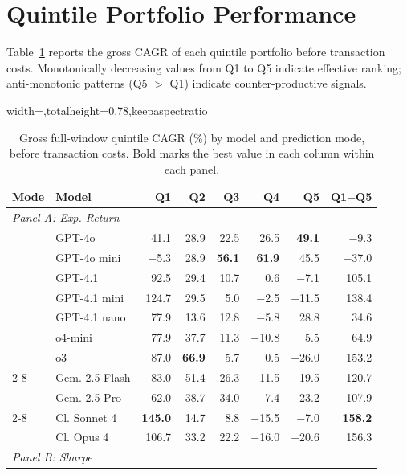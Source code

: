 \section{Quintile Portfolio Performance}
\label{app:quintile-cagr}

Table~\ref{tab:quintile-cagr} reports the gross CAGR of each quintile portfolio before transaction costs.
Monotonically decreasing values from Q1 to Q5 indicate effective ranking; anti-monotonic patterns (Q5 $>$ Q1) indicate counter-productive signals.

\begin{table}[H]
\centering
\caption{Gross full-window quintile CAGR (\%) by model and prediction mode, before transaction costs. Bold marks the best value in each column within each panel.}
\label{tab:quintile-cagr}
\scriptsize
\setlength{\tabcolsep}{3pt}
\renewcommand{\arraystretch}{0.80}
\begin{adjustbox}{width=\textwidth,totalheight=0.78\textheight,keepaspectratio}
\begin{tabular}{ll rrrrrr}
\toprule
\textbf{Mode} & \textbf{Model} & \textbf{Q1} & \textbf{Q2} & \textbf{Q3} & \textbf{Q4} & \textbf{Q5} & \textbf{Q1$-$Q5} \\
\midrule
\multicolumn{8}{l}{\textit{Panel A: Exp. Return}} \\
\midrule
& GPT-4o & 41.1 & 28.9 & 22.5 & 26.5 & \textbf{49.1} & $-$9.3 \\
& GPT-4o mini & $-$5.3 & 28.9 & \textbf{56.1} & \textbf{61.9} & 45.5 & $-$37.0 \\
& GPT-4.1 & 92.5 & 29.4 & 10.7 & 0.6 & $-$7.1 & 105.1 \\
& GPT-4.1 mini & 124.7 & 29.5 & 5.0 & $-$2.5 & $-$11.5 & 138.4 \\
& GPT-4.1 nano & 77.9 & 13.6 & 12.8 & $-$5.8 & 28.8 & 34.6 \\
& o4-mini & 77.9 & 37.7 & 11.3 & $-$10.8 & 5.5 & 64.9 \\
& o3 & 87.0 & \textbf{66.9} & 5.7 & 0.5 & $-$26.0 & 153.2 \\
\cmidrule(l){2-8}
& Gem. 2.5 Flash & 83.0 & 51.4 & 26.3 & $-$11.5 & $-$19.5 & 120.7 \\
& Gem. 2.5 Pro & 62.0 & 38.7 & 34.0 & 7.4 & $-$23.2 & 107.9 \\
\cmidrule(l){2-8}
& Cl. Sonnet 4 & \textbf{145.0} & 14.7 & 8.8 & $-$15.5 & $-$7.0 & \textbf{158.2} \\
& Cl. Opus 4 & 106.7 & 33.2 & 22.2 & $-$16.0 & $-$20.6 & 156.3 \\
\midrule
\multicolumn{8}{l}{\textit{Panel B: Sharpe}} \\

\end{tabular}
\end{adjustbox}
\end{table}
